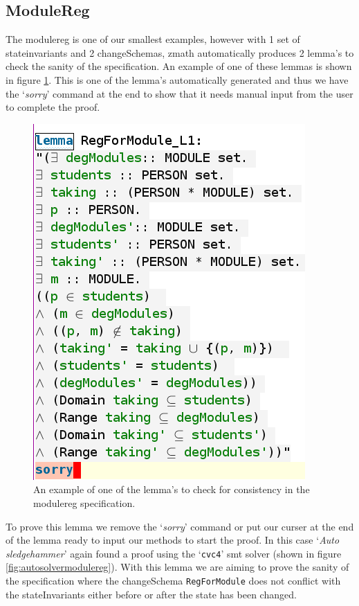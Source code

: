 \subsection{ModuleReg}

The modulereg is one of our smallest examples, however with 1 set of
stateinvariants and 2 changeSchemas, \gls{zmath} automatically produces 2 lemma's
to check the sanity of the specification. An example of one of these lemmas is
shown in figure \ref{fig:modulereglemma1}. This is one of the lemma's
automatically generated and thus we have the `\emph{sorry}' command at the end
to show that it needs manual input from the user to complete the proof.

\begin{figure}[H]
\centering
\includegraphics[scale=0.5]{Figures/Evaluation/lemmaformodulereg.png}
\caption{An example of one of the lemma's to check for consistency in the modulereg specification. \label{fig:modulereglemma1}}
\end{figure}

To prove this lemma we remove the `\emph{sorry}' command or put our curser at
the end of the lemma ready to input our methods to start the proof. In this case
`\emph{Auto sledgehammer}' again found a proof using the `\texttt{cvc4}'
\gls{smt} solver (shown in figure \ref{fig:autosolvermodulereg}). With this
lemma we are aiming to prove the sanity of the specification where the
changeSchema \verb|RegForModule| does not conflict with the stateInvariants
either before or after the state has been changed.

